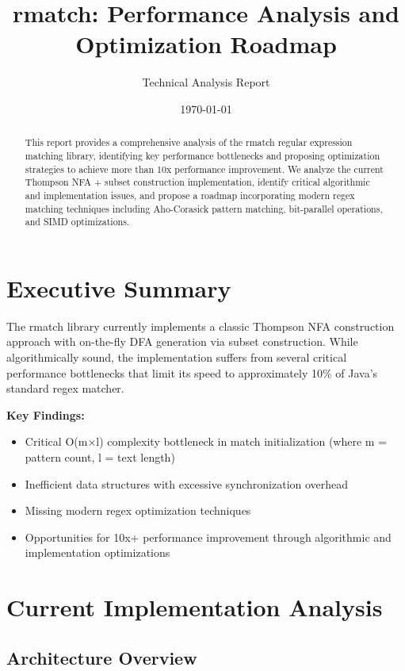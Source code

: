 \documentclass[11pt,a4paper]{article}
\title{rmatch: Performance Analysis and Optimization Roadmap}
\author{Technical Analysis Report}
\date{\today}
\begin{document}
\maketitle

\begin{abstract}
This report provides a comprehensive analysis of the rmatch regular expression matching library, identifying key performance bottlenecks and proposing optimization strategies to achieve more than 10x performance improvement. We analyze the current Thompson NFA + subset construction implementation, identify critical algorithmic and implementation issues, and propose a roadmap incorporating modern regex matching techniques including Aho-Corasick pattern matching, bit-parallel operations, and SIMD optimizations.
\end{abstract}

\section{Executive Summary}

The rmatch library currently implements a classic Thompson NFA construction approach with on-the-fly DFA generation via subset construction. While algorithmically sound, the implementation suffers from several critical performance bottlenecks that limit its speed to approximately 10\% of Java's standard regex matcher.

\textbf{Key Findings:}
\begin{itemize}
\item Critical O(m×l) complexity bottleneck in match initialization (where m = pattern count, l = text length)
\item Inefficient data structures with excessive synchronization overhead
\item Missing modern regex optimization techniques
\item Opportunities for 10x+ performance improvement through algorithmic and implementation optimizations
\end{itemize}

\section{Current Implementation Analysis}

\subsection{Architecture Overview}
\end{document}
